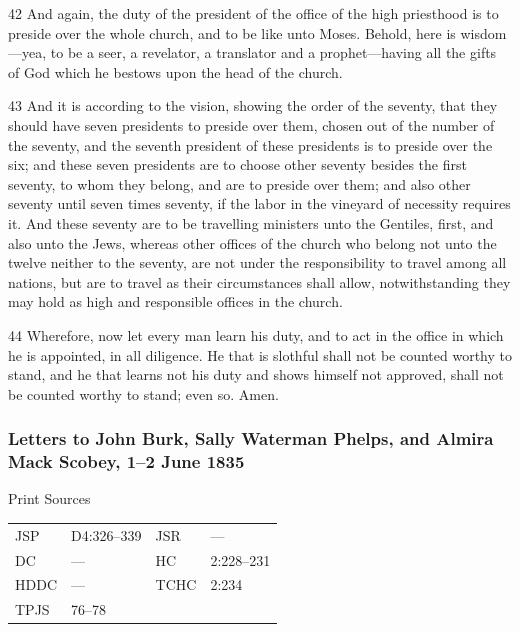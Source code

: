 				42 And again, the duty of the president of the office of the high priesthood is to preside over the whole church, and to be like unto Moses. Behold, here is wisdom---yea, to be a seer, a revelator, a translator and a prophet---having all the gifts of God which he bestows upon the head of the church.

				43 And it is according to the vision, showing the order of the seventy, that they should have seven presidents to preside over them, chosen out of the number of the seventy, and the seventh president of these presidents is to preside over the six; and these seven presidents are to choose other seventy besides the first seventy, to whom they belong, and are to preside over them; and also other seventy until seven times seventy, if the labor in the vineyard of necessity requires it. And these seventy are to be travelling ministers unto the Gentiles, first, and also unto the Jews, whereas other offices of the church who belong not unto the twelve neither to the seventy, are not under the responsibility to travel among all nations, but are to travel as their circumstances shall allow, notwithstanding they may hold as high and responsible offices in the church.

				44 Wherefore, now let every man learn his duty, and to act in the office in which he is appointed, in all diligence. He that is slothful shall not be counted worthy to stand, and he that learns not his duty and shows himself not approved, shall not be counted worthy to stand; even so. Amen.

		\subsubsection{Letters to John Burk, Sally Waterman Phelps, and Almira Mack Scobey, 1--2 June 1835}
			\label{EMS-1835-JS-1-2-JUN-1835}
			
			\begin{description}
				\item[Print Sources]
			\end{description}

				\begin{tabular}{p{0.5in}p{1in}p{0.5in}p{1in}}
				JSP	 	& D4:326--339		& JSR 		& --- \\
				DC	 	& --- 				& HC 		& 2:228--231 \\
				HDDC 	& ---				& TCHC 		& 2:234 \\
				TPJS 	& 76--78			& 	 		&  \\
				\end{tabular}
			
